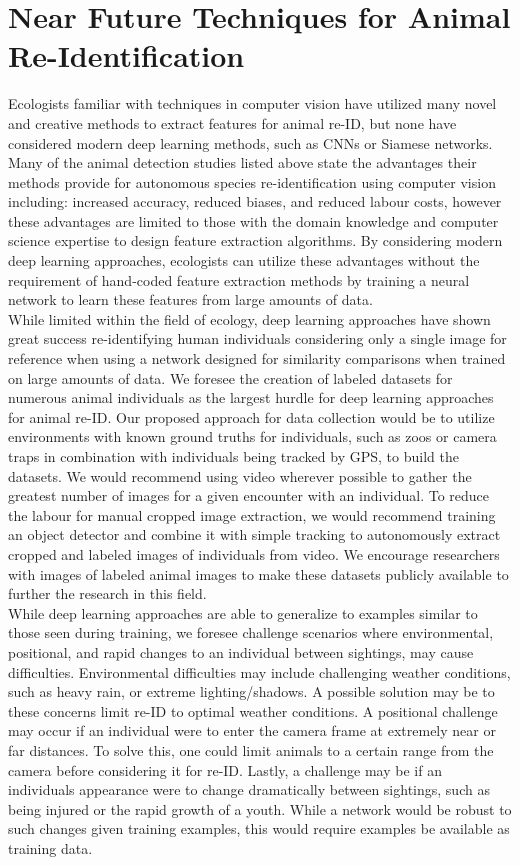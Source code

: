 \documentclass[11pt]{article}
\begin{document}
\section*{Near Future Techniques for Animal Re-Identification}
Ecologists familiar with techniques in computer vision have utilized many novel and creative methods to extract features for animal re-ID, but none have considered modern deep learning methods, such as CNNs or Siamese networks. Many of the animal detection studies listed above state the advantages their methods provide for autonomous species re-identification using computer vision including: increased accuracy, reduced biases, and reduced labour costs, however these advantages are limited to those with the domain knowledge and computer science expertise to design feature extraction algorithms. By considering modern deep learning approaches, ecologists can utilize these advantages without the requirement of hand-coded feature extraction methods by training a neural network to learn these features from large amounts of data. 
\newline
\\
While limited within the field of ecology, deep learning approaches have shown great success re-identifying human individuals considering only a single image for reference when using a network designed for similarity comparisons when trained on large amounts of data. We foresee the creation of labeled datasets for numerous animal individuals as the largest hurdle for deep learning approaches for animal re-ID. Our proposed approach for data collection would be to utilize environments with known ground truths for individuals, such as zoos or camera traps in combination with individuals being tracked by GPS, to build the datasets. We would recommend using video wherever possible to gather the greatest number of images for a given encounter with an individual. To reduce the labour for manual cropped image extraction, we would recommend training an object detector and combine it with simple tracking to autonomously extract cropped and labeled images of individuals from video. We encourage researchers with images of labeled animal images to make these datasets publicly available to further the research in this field.
\newline
\\
While deep learning approaches are able to generalize to examples similar to those seen during training, we foresee challenge scenarios where environmental, positional, and rapid changes to an individual between sightings, may cause difficulties. Environmental difficulties may include challenging weather conditions, such as heavy rain, or extreme lighting/shadows. A possible solution may be to these concerns limit re-ID to optimal weather conditions. A positional challenge may occur if an individual were to enter the camera frame at extremely near or far distances. To solve this, one could limit animals to a certain range from the camera before considering it for re-ID. Lastly, a challenge may be if an individuals appearance were to change dramatically between sightings, such as being injured or the rapid growth of a youth. While a network would be robust to such changes given training examples, this would require examples be available as training data. 
\end{document}

